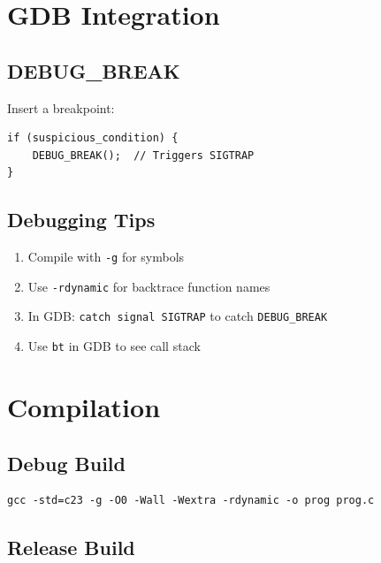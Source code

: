 \documentclass[11pt,a4paper]{article}
\begin{document}
\section{GDB Integration}

\subsection{DEBUG\_BREAK}

Insert a breakpoint:

\begin{lstlisting}
if (suspicious_condition) {
    DEBUG_BREAK();  // Triggers SIGTRAP
}
\end{lstlisting}

\subsection{Debugging Tips}

\begin{enumerate}
    \item Compile with \texttt{-g} for symbols
    \item Use \texttt{-rdynamic} for backtrace function names
    \item In GDB: \texttt{catch signal SIGTRAP} to catch \texttt{DEBUG\_BREAK}
    \item Use \texttt{bt} in GDB to see call stack
\end{enumerate}

\section{Compilation}

\subsection{Debug Build}

\begin{verbatim}
gcc -std=c23 -g -O0 -Wall -Wextra -rdynamic -o prog prog.c
\end{verbatim}

\subsection{Release Build}
\end{document}
